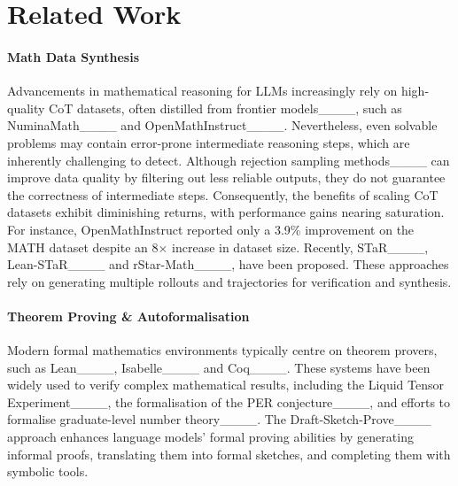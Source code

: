 \section{Related Work}
\label{sec:bibtex}

\paragraph{Math Data Synthesis} Advancements in mathematical reasoning for LLMs increasingly rely on high-quality CoT datasets, often distilled from frontier models____, such as
NuminaMath____ and OpenMathInstruct____. Nevertheless, even solvable problems may contain error-prone intermediate reasoning steps, which are inherently challenging to detect. Although rejection sampling methods____ can improve data quality by filtering out less reliable outputs, they do not guarantee the correctness of intermediate steps. Consequently, the benefits of scaling CoT datasets exhibit diminishing returns, with performance gains nearing saturation. For instance, OpenMathInstruct reported only a 3.9\% improvement on the MATH dataset despite an 8× increase in dataset size. Recently, STaR____,
Lean-STaR____ and rStar-Math____, have been proposed. These approaches rely on generating multiple rollouts and trajectories for verification and synthesis.

\paragraph{Theorem Proving \& Autoformalisation} Modern formal mathematics environments typically centre on theorem provers, such as Lean____, Isabelle____ and Coq____. These systems have been widely used to verify complex mathematical results, including the Liquid Tensor Experiment____, the formalisation of the PER conjecture____, and efforts to formalise graduate-level number theory____.
The Draft-Sketch-Prove____ approach enhances language models’ formal proving abilities by generating informal proofs, translating them into formal sketches, and completing them with symbolic tools. 
